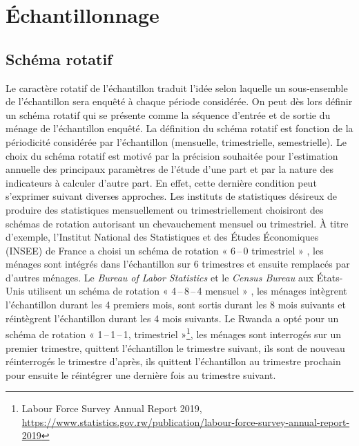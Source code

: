 \documentclass[12pt, a4paper]{article}
\begin{document}
\section{Échantillonnage}

\subsection{Schéma rotatif}

Le caractère rotatif de l'échantillon traduit l'idée selon laquelle un sous-ensemble de l'échantillon sera enquêté à chaque période considérée. On peut dès lors définir un schéma rotatif qui se présente comme la séquence d'entrée et de sortie du ménage de l'échantillon enquêté. La définition du schéma rotatif est fonction de la périodicité considérée par l'échantillon (mensuelle, trimestrielle, semestrielle). Le choix du schéma rotatif est motivé par la précision souhaitée pour l'estimation annuelle des principaux paramètres de l'étude d'une part et par la nature des indicateurs à calculer d'autre part. En effet, cette dernière condition peut s'exprimer suivant diverses approches. Les instituts de statistiques désireux de produire des statistiques mensuellement ou trimestriellement choisiront des schémas de rotation autorisant un chevauchement mensuel ou trimestriel. À titre d'exemple, l'Institut National des Statistiques et des Études Économiques (INSEE) de France a choisi un schéma de rotation « 6\,--\,0 trimestriel » \cite{loonis2009}, les ménages sont intégrés dans l'échantillon sur 6 trimestres et ensuite remplacés par d'autres ménages. Le \textit{Bureau of Labor Statistics} et le \textit{Census Bureau} aux États-Unis utilisent un schéma de rotation « 4\,--\,8\,--\,4 mensuel » \cite{cheng2012}, les ménages intègrent l'échantillon durant les 4 premiers mois, sont sortis durant les 8 mois suivants et réintègrent l'échantillon durant les 4 mois suivants. Le Rwanda a opté pour un schéma de rotation « 1\,--\,1\,--\,1, trimestriel »\footnote{Labour Force Survey Annual Report 2019, \url{https://www.statistics.gov.rw/publication/labour-force-survey-annual-report-2019}}, les ménages sont interrogés sur un premier trimestre, quittent l'échantillon le trimestre suivant, ils sont de nouveau réinterrogés le trimestre d'après, ils quittent l'échantillon au trimestre prochain pour ensuite le réintégrer une dernière fois au trimestre suivant.
\end{document}
